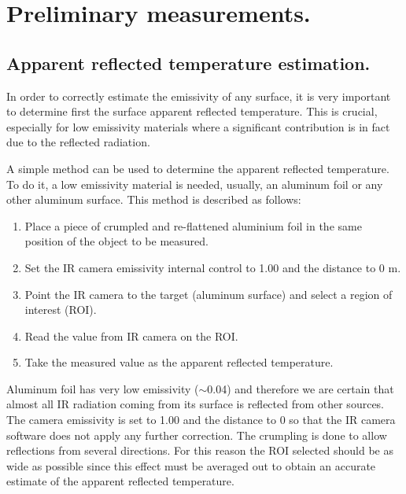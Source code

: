 \pagestyle{standard}

\chapter{Preliminary measurements.}\label{chapter3}

	\thispagestyle{chapter-first-page}

	\section{Apparent reflected temperature estimation.}\label{section3.1}
	
		In order to correctly estimate the emissivity of any surface, it is very important to determine first the surface apparent reflected temperature. This is crucial, especially for low emissivity materials where a significant contribution is in fact due to the reflected radiation.
		
		A simple method can be used to determine the apparent reflected temperature. To do it, a low emissivity material is needed, usually, an aluminum foil or any other aluminum surface. This method is described as follows:
		
		\begin{enumerate}[label={\arabic*)}]
			\item Place a piece of crumpled and re-flattened aluminium foil in the same position of the object to be measured.
			\item Set the IR camera emissivity internal control to 1.00 and the distance to 0 m.
			\item Point the IR camera to the target (aluminum surface) and select a region of interest (ROI).
			\item Read the value from IR camera on the ROI.
			\item Take the measured value as the apparent reflected temperature.
		\end{enumerate}
	
		Aluminum foil has very low emissivity ($\sim$0.04) and therefore we are certain that almost all IR radiation coming from its surface is reflected from other sources. The camera emissivity is set to 1.00 and the distance to 0 so that the IR camera software does not apply any further correction. The crumpling is done to allow reflections from several directions. For this reason the ROI selected should be as wide as possible since this effect must be averaged out to obtain an accurate estimate of the apparent reflected temperature.\bigskip
	
